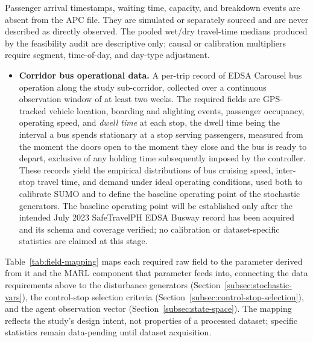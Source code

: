 Passenger arrival timestamps, waiting time, capacity, and breakdown events are absent from the APC file. They are simulated or separately sourced and are never described as directly observed. The pooled wet/dry travel-time medians produced by the feasibility audit are descriptive only; causal or calibration multipliers require segment, time-of-day, and day-type adjustment.

\iffalse
\begin{itemize}

\item \textbf{Corridor bus operational data.} A per-trip record of EDSA Carousel bus operation along the study sub-corridor, collected over a continuous observation window of at least two weeks. The required fields are GPS-tracked vehicle location, boarding and alighting events, passenger occupancy, operating speed, and \textit{dwell time} at each stop, the dwell time being the interval a bus spends stationary at a stop serving passengers, measured from the moment the doors open to the moment they close and the bus is ready to depart, exclusive of any holding time subsequently imposed by the controller. These records yield the empirical distributions of bus cruising speed, inter-stop travel time, and demand under ideal operating conditions, used both to calibrate SUMO and to define the baseline operating point of the stochastic generators. The baseline operating point will be established only after the intended July 2023 SafeTravelPH EDSA Busway record has been acquired and its schema and coverage verified; no calibration or dataset-specific statistics are claimed at this stage.


\end{itemize}

Table~\ref{tab:field-mapping} maps each required raw field to the parameter derived from it and the MARL component that parameter feeds into, connecting the data requirements above to the disturbance generators (Section~\ref{subsec:stochastic-vars}), the control-stop selection criteria (Section~\ref{subsec:control-stop-selection}), and the agent observation vector (Section~\ref{subsec:state-space}). The mapping reflects the study's design intent, not properties of a processed dataset; specific statistics remain data-pending until dataset acquisition.

